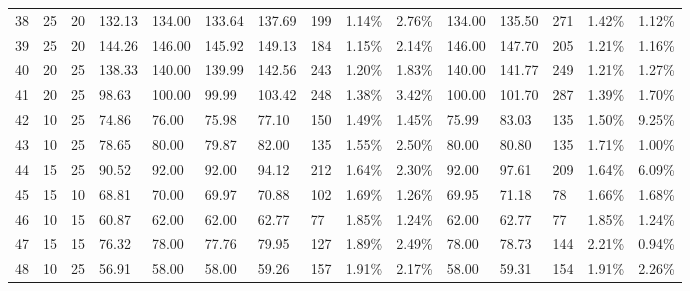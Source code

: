 \documentclass[
  a4paper,
,tablecaptionabove
]{scrartcl}
\numberwithin{equation}{section}
\begin{document}
\begin{longtable}{l|ll|ll|lllll|lllll}
  38 & 25                         & 20                         & 132.13                    & 134.00      & 133.64        & 137.69 & 199 & 1.14\%  & 2.76\% & 134.00 & 135.50 & 271 & 1.42\%  & 1.12\%  \\
  39 & 25                         & 20                         & 144.26                    & 146.00      & 145.92        & 149.13 & 184 & 1.15\%  & 2.14\% & 146.00 & 147.70 & 205 & 1.21\%  & 1.16\%  \\
  40 & 20                         & 25                         & 138.33                    & 140.00      & 139.99        & 142.56 & 243 & 1.20\%  & 1.83\% & 140.00 & 141.77 & 249 & 1.21\%  & 1.27\%  \\
  41 & 20                         & 25                         & 98.63                     & 100.00      & 99.99         & 103.42 & 248 & 1.38\%  & 3.42\% & 100.00 & 101.70 & 287 & 1.39\%  & 1.70\%  \\
  42 & 10                         & 25                         & 74.86                     & 76.00       & 75.98         & 77.10  & 150 & 1.49\%  & 1.45\% & 75.99  & 83.03  & 135 & 1.50\%  & 9.25\%  \\
  43 & 10                         & 25                         & 78.65                     & 80.00       & 79.87         & 82.00  & 135 & 1.55\%  & 2.50\% & 80.00  & 80.80  & 135 & 1.71\%  & 1.00\%  \\
  44 & 15                         & 25                         & 90.52                     & 92.00       & 92.00         & 94.12  & 212 & 1.64\%  & 2.30\% & 92.00  & 97.61  & 209 & 1.64\%  & 6.09\%  \\
  45 & 15                         & 10                         & 68.81                     & 70.00       & 69.97         & 70.88  & 102 & 1.69\%  & 1.26\% & 69.95  & 71.18  & 78  & 1.66\%  & 1.68\%  \\
  46 & 10                         & 15                         & 60.87                     & 62.00       & 62.00         & 62.77  & 77  & 1.85\%  & 1.24\% & 62.00  & 62.77  & 77  & 1.85\%  & 1.24\%  \\
  47 & 15                         & 15                         & 76.32                     & 78.00       & 77.76         & 79.95  & 127 & 1.89\%  & 2.49\% & 78.00  & 78.73  & 144 & 2.21\%  & 0.94\%  \\
  48 & 10                         & 25                         & 56.91                     & 58.00       & 58.00         & 59.26  & 157 & 1.91\%  & 2.17\% & 58.00  & 59.31  & 154 & 1.91\%  & 2.26\%  \\

\end{longtable}
\end{document}
